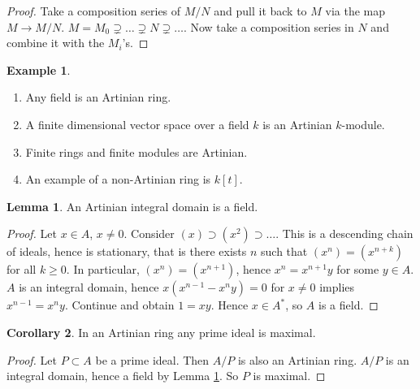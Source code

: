 \documentclass{article}
\newcommand{\rb}[1]{\left( #1 \right)}
\renewcommand{\sb}[1]{\left[ #1 \right]}
\theoremstyle{definition}\newtheorem{definition}{Definition}[section]
\theoremstyle{definition}\newtheorem{remark}[definition]{Remark}
\theoremstyle{definition}\newtheorem*{example}{Example}
\theoremstyle{definition}\newtheorem*{note}{Note}
\newtheorem{lemma}[definition]{Lemma}
\newtheorem{corollary}[definition]{Corollary}
\begin{document}
\begin{proof}
Take a composition series of $ M / N $ and pull it back to $ M $ via the map $ M \to M / N $. $ M = M_0 \supsetneq \dots \supsetneq N \supsetneq \dots $. Now take a composition series in $ N $ and combine it with the $ M_i $'s.
\end{proof}


\begin{example}
\hfill
\begin{enumerate}
\item Any field is an Artinian ring.
\item A finite dimensional vector space over a field $ k $ is an Artinian $ k $-module.
\item Finite rings and finite modules are Artinian.
\item An example of a non-Artinian ring is $ k\sb{t} $.
\end{enumerate}
\end{example}

\begin{lemma}
\label{lem:12.6}
An Artinian integral domain is a field.
\end{lemma}

\begin{proof}
Let $ x \in A $, $ x \ne 0 $. Consider $ \rb{x} \supset \rb{x^2} \supset \dots $. This is a descending chain of ideals, hence is stationary, that is there exists $ n $ such that $ \rb{x^n} = \rb{x^{n + k}} $ for all $ k \ge 0 $. In particular, $ \rb{x^n} = \rb{x^{n + 1}} $, hence $ x^n = x^{n + 1}y $ for some $ y \in A $. $ A $ is an integral domain, hence $ x\rb{x^{n - 1} - x^ny} = 0 $ for $ x \ne 0 $ implies $ x^{n - 1} = x^ny $. Continue and obtain $ 1 = xy $. Hence $ x \in A^* $, so $ A $ is a field.
\end{proof}

\begin{corollary}
\label{cor:12.7}
In an Artinian ring any prime ideal is maximal.
\end{corollary}

\begin{proof}
Let $ P \subset A $ be a prime ideal. Then $ A / P $ is also an Artinian ring. $ A / P $ is an integral domain, hence a field by Lemma \ref{lem:12.6}. So $ P $ is maximal.
\end{proof}
\end{document}
